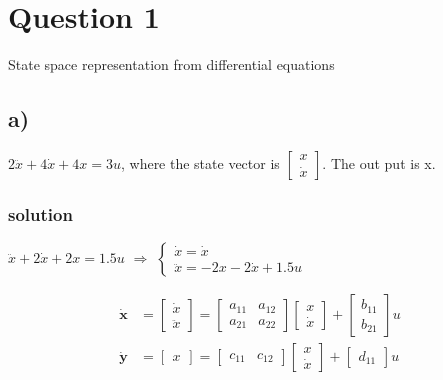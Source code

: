 \section{Question 1}
    State space representation from differential equations

    \subsection{a)} 
    $2\ddot{x} + 4\dot{x} + 4x=3u$, where the state vector is 
    $\begin{bmatrix}
        x \\
        \dot{x}
    \end{bmatrix}$.
    The out put is x.
    \subsubsection{solution}
    $\ddot{x} + 2\dot{x} + 2x=1.5u$ $\Rightarrow$ 
    $\left\{
        \begin{array}{lr}
        \dot{x} = \dot{x} \\
        \ddot{x} = -2x -2\dot{x} + 1.5u
        \end{array}
    \right.$

    \begin{align}
        \dot{\textbf{x}} &=
        \begin{bmatrix}
            \dot{x} \\
            \ddot{x}
        \end{bmatrix} = 
        \begin{bmatrix}
            a_{11} & a_{12} \\
            a_{21} & a_{22}
        \end{bmatrix}
        \begin{bmatrix}
            x \\
            \dot{x}
        \end{bmatrix} + 
        \begin{bmatrix}
            b_{11}\\
            b_{21}
        \end{bmatrix}
        u
        \\
        \dot{\textbf{y}} &=
        \begin{bmatrix}
            x
        \end{bmatrix} =
        \begin{bmatrix}
            c_{11} & c_{12}
        \end{bmatrix}
        \begin{bmatrix}
            x \\
            \dot{x}
        \end{bmatrix} + 
        \begin{bmatrix}
            d_{11}
        \end{bmatrix}
        u
    \end{align}


